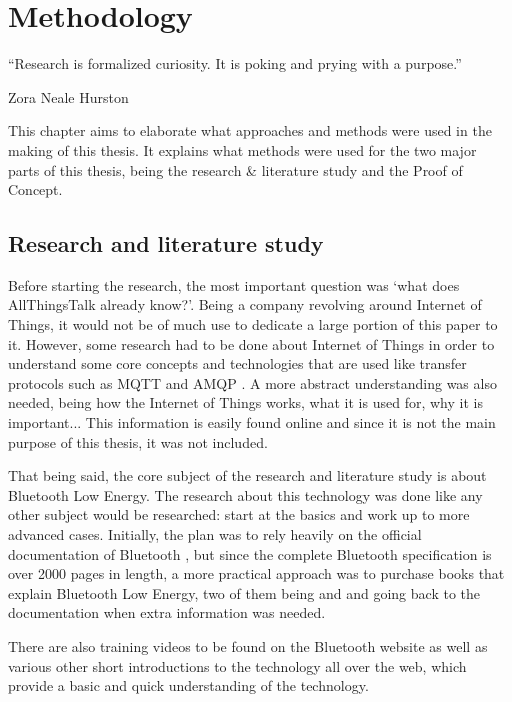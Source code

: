 \documentclass[pdftex,a4paper,12pt,twoside]{report}
\begin{document}
\chapter{Methodology}
\label{ch:methodology}
\epigraph{``Research is formalized curiosity. It is poking and prying with a purpose.''}{Zora Neale Hurston}
This chapter aims to elaborate what approaches and methods were used in the making of this thesis. It explains what methods were used for the two major parts of this thesis, being the research \& literature study and the Proof of Concept.

\section{Research and literature study}
\label{sec:researchlit}
Before starting the research, the most important question was `what does AllThingsTalk already know?'. Being a company revolving around Internet of Things, it would not be of much use to dedicate a large portion of this paper to it. However, some research had to be done about Internet of Things in order to understand some core concepts and technologies that are used like transfer protocols such as MQTT and AMQP \citep{waher2015learning}. A more abstract understanding was also needed, being how the Internet of Things works, what it is used for, why it is important... This information is easily found online and since it is not the main purpose of this thesis, it was not included.

That being said, the core subject of the research and literature study is about Bluetooth Low Energy. The research about this technology was done like any other subject would be researched: start at the basics and work up to more advanced cases. Initially, the plan was to rely heavily on the official documentation of Bluetooth \citep{bluetooth2014bluetooth}, but since the complete Bluetooth specification is over 2000 pages in length, a more practical approach was to purchase books that explain Bluetooth Low Energy, two of them being \cite{Townsend2014} and \cite{heydon2012bluetooth} and going back to the documentation when extra information was needed.

There are also training videos to be found on the Bluetooth website \citep{bluetooth2016training} as well as various other short introductions to the technology all over the web, which provide a basic and quick understanding of the technology.
\end{document}
